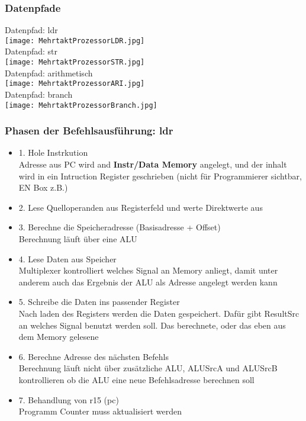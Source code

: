 		\subsubsection{Datenpfade}
			\begin{center}
				Datenpfad: ldr \\
				\texttt{[image: MehrtaktProzessorLDR.jpg]} \\
				Datenpfad: str \\
				\texttt{[image: MehrtaktProzessorSTR.jpg]} \\
				Datenpfad: arithmetisch \\
				\texttt{[image: MehrtaktProzessorARI.jpg]} \\
				Datenpfad: branch \\
				\texttt{[image: MehrtaktProzessorBranch.jpg]} \\
			\end{center}

		\subsubsection{Phasen der Befehlsausführung: ldr}
			\begin{itemize}
				\item 1. Hole Instrkution \\
					Adresse aus PC wird and \textbf{Instr/Data Memory} angelegt, und der inhalt wird
					in ein Intruction Register geschrieben (nicht für Programmierer sichtbar, EN Box z.B.)
				\item 2. Lese Quelloperanden aus Registerfeld und werte Direktwerte aus
				\item 3. Berechne die Speicheradresse (Basisadresse + Offset) \\
					Berechnung läuft über eine ALU
				\item 4. Lese Daten aus Speicher \\
					Multiplexer kontrolliert welches Signal an Memory anliegt, damit unter anderem
					auch das Ergebnis der ALU als Adresse angelegt werden kann
				\item 5. Schreibe die Daten ins passender Register \\
					Nach laden des Registers werden die Daten gespeichert. Dafür gibt ResultSrc an welches
					Signal benutzt werden soll. Das berechnete, oder das eben aus dem Memory gelesene
				\item 6. Berechne Adresse des nächsten Befehls \\
					Berechnung läuft nicht über zusätzliche ALU, ALUSrcA und ALUSrcB kontrollieren ob die ALU
					eine neue Befehlsadresse berechnen soll
				\item 7. Behandlung von r15 (pc) \\
					Programm Counter muss aktualisiert werden
			\end{itemize}



